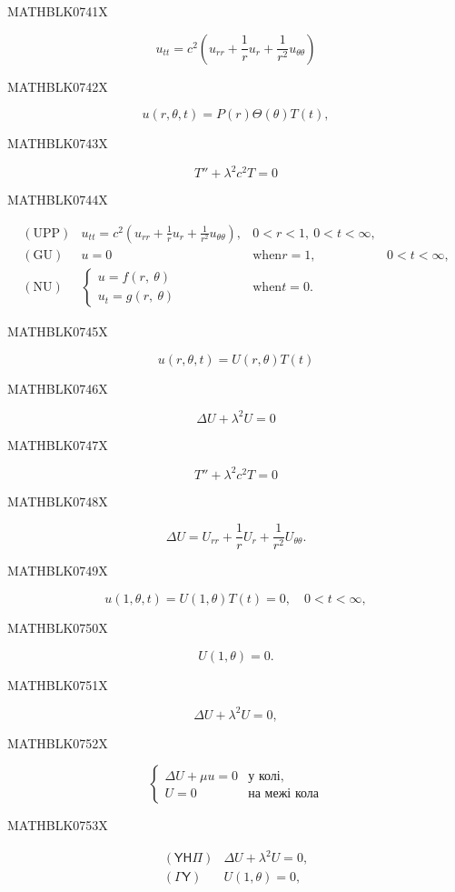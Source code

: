 \documentclass[
  ukrainian,
]{article}
\begin{document}
MATHBLK0741X

\[
u_{tt} = c^2 \left( u_{rr} + \frac{1}{r} u_r + \frac{1}{r^2} u_{\theta\theta} \right)
\]

MATHBLK0742X

\[
u(r, \theta, t) = P(r) \Theta(\theta) T(t),
\]

MATHBLK0743X

\[
T'' + \lambda^2 c^2 T = 0
\]

MATHBLK0744X

\[
\begin{array}{llll} (\text{UPP}) & u_{tt} = c^2 \left( u_{rr} + \frac{1}{r} u_r + \frac{1}{r^2} u_{\theta\theta} \right), & 0 < r < 1, \ 0 <t < \infty, \\ (\text{GU}) & u = 0 & \text{when} r = 1, & 0 < t < \infty, \\ (\text{NU}) & \begin{cases} u = f(r, \ \theta) \\ u_t = g(r, \ \theta) \end{cases} & \text{when} t = 0. \end{array}
\]

MATHBLK0745X

\[
u(r, \theta, t) = U(r, \theta) T(t)
\]

MATHBLK0746X

\[
\Delta U + \lambda^2 U = 0
\]

MATHBLK0747X

\[
T'' + \lambda^2 c^2 T = 0
\]

MATHBLK0748X

\[
\Delta U = U_{rr} + \frac{1}{r} U_r + \frac{1}{r^2} U_{\theta\theta}.
\]

MATHBLK0749X

\[
u(1, \theta, t) = U(1, \theta) T(t) = 0, \quad 0 < t < \infty,
\]

MATHBLK0750X

\[
U(1, \theta) = 0.
\]

MATHBLK0751X

\[
\Delta U + \lambda^2 U = 0,
\]

MATHBLK0752X

\[
\begin{cases} \Delta U + \mu u = 0 & \text{у колі,} \\ U = 0 & \text{на межі кола} \end{cases}
\]

MATHBLK0753X

\[
\begin{array}{llll} (\mathsf{Y}\mathsf{H}\mathsf{\Pi}) & \Delta U + \lambda^2 U = 0, \\ (\mathsf{\Gamma}\mathsf{Y}) & U(1, \theta) = 0, \end{array}
\]
\end{document}
